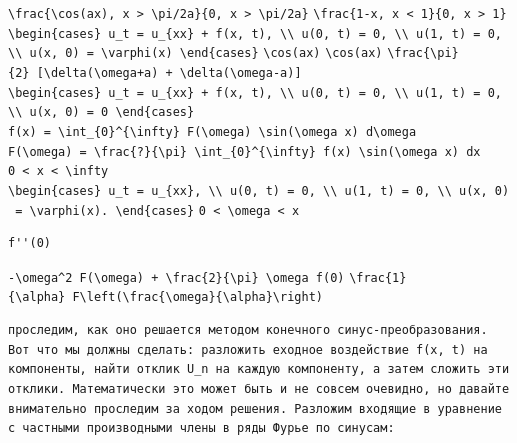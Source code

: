 \documentclass[
  ukrainian,
]{article}
\begin{document}
\texttt{\textbackslash{}frac\{\textbackslash{}cos(ax),\ \textbar{}x\textbar{}\ \textgreater{}\ \textbackslash{}pi/2a\}\{0,\ \textbar{}x\textbar{}\ \textgreater{}\ \textbackslash{}pi/2a\}}
\texttt{\textbackslash{}frac\{1-\textbar{}x\textbar{},\ \textbar{}x\textbar{}\ \textless{}\ 1\}\{0,\ \textbar{}x\textbar{}\ \textgreater{}\ 1\}}
\texttt{\textbackslash{}begin\{cases\}\ u\_t\ =\ u\_\{xx\}\ +\ f(x,\ t),\ \textbackslash{}\textbackslash{}\ u(0,\ t)\ =\ 0,\ \textbackslash{}\textbackslash{}\ u(1,\ t)\ =\ 0,\ \textbackslash{}\textbackslash{}\ u(x,\ 0)\ =\ \textbackslash{}varphi(x)\ \textbackslash{}end\{cases\}}
\texttt{\textbackslash{}cos(ax)} \texttt{\textbackslash{}cos(ax)}
\texttt{\textbackslash{}frac\{\textbackslash{}pi\}\{2\}\ {[}\textbackslash{}delta(\textbackslash{}omega+a)\ +\ \textbackslash{}delta(\textbackslash{}omega-a){]}}
\texttt{\textbackslash{}begin\{cases\}\ u\_t\ =\ u\_\{xx\}\ +\ f(x,\ t),\ \textbackslash{}\textbackslash{}\ u(0,\ t)\ =\ 0,\ \textbackslash{}\textbackslash{}\ u(1,\ t)\ =\ 0,\ \textbackslash{}\textbackslash{}\ u(x,\ 0)\ =\ 0\ \textbackslash{}end\{cases\}}
\texttt{f(x)\ =\ \textbackslash{}int\_\{0\}\^{}\{\textbackslash{}infty\}\ F(\textbackslash{}omega)\ \textbackslash{}sin(\textbackslash{}omega\ x)\ d\textbackslash{}omega}
\texttt{F(\textbackslash{}omega)\ =\ \textbackslash{}frac\{?\}\{\textbackslash{}pi\}\ \textbackslash{}int\_\{0\}\^{}\{\textbackslash{}infty\}\ f(x)\ \textbackslash{}sin(\textbackslash{}omega\ x)\ dx}
\texttt{0\ \textless{}\ x\ \textless{}\ \textbackslash{}infty}
\texttt{\textbackslash{}begin\{cases\}\ u\_t\ =\ u\_\{xx\},\ \textbackslash{}\textbackslash{}\ u(0,\ t)\ =\ 0,\ \textbackslash{}\textbackslash{}\ u(1,\ t)\ =\ 0,\ \textbackslash{}\textbackslash{}\ u(x,\ 0)\ =\ \textbackslash{}varphi(x).\ \textbackslash{}end\{cases\}}
\texttt{0\ \textless{}\ \textbackslash{}omega\ \textless{}\ x}

\begin{verbatim}
f''(0)
\end{verbatim}

\texttt{-\textbackslash{}omega\^{}2\ F(\textbackslash{}omega)\ +\ \textbackslash{}frac\{2\}\{\textbackslash{}pi\}\ \textbackslash{}omega\ f(0)}
\texttt{\textbackslash{}frac\{1\}\{\textbackslash{}alpha\}\ F\textbackslash{}left(\textbackslash{}frac\{\textbackslash{}omega\}\{\textbackslash{}alpha\}\textbackslash{}right)}

\begin{verbatim}
проследим, как оно решается методом конечного синус-преобразования. Вот что мы должны сделать: разложить еходное воздействие f(x, t) на компоненты, найти отклик U_n на каждую компоненту, а затем сложить эти отклики. Математически это может быть и не совсем очевидно, но давайте внимательно проследим за ходом решения. Разложим входящие в уравнение с частными производными члены в ряды Фурье по синусам:
\end{verbatim}
\end{document}
